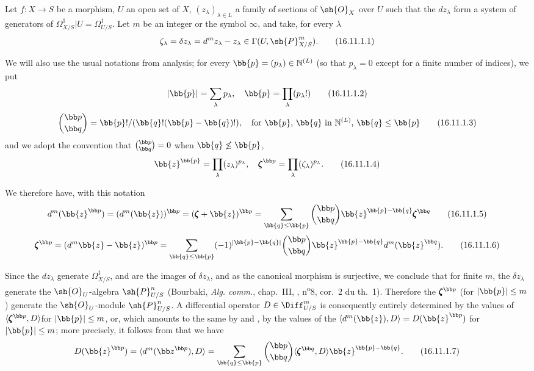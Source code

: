 \begin{env}[16.11.1]
\label{IV.16.11.1}
Let $f:X \to S$ be a morphism, $U$ an open set of $X$, $(z_\lambda)_{\lambda \in L}$ a family of sections of $\sh{O}_X$ over $U$ such that the $dz_\lambda$ form a system of generators of $\Omega_{X/S}^1|U = \Omega_{U/S}^1$.
Let $m$ be an integer or the symbol $\infty$, and take, for every $\lambda$
\[
  \label{IV.16.11.1.1}
  \zeta_\lambda = \delta z_\lambda = d^m z_\lambda - z_\lambda \in \Gamma(U, \sh{P}_{X/S}^m).
  \tag{16.11.1.1}
\]

We will also use the usual notations from analysis;
for every $\bb{p} = (p_\lambda) \in \mathbb{N}^{(L)}$ (so that $p_\lambda = 0$ except for a finite number of indices), we put
\[
  \label{IV.16.11.1.2}
  |\bb{p}| = \sum_\lambda p_\lambda, \quad \bb{p} = \prod_\lambda (p_\lambda!)
  \tag{16.11.1.2}
\]
\[
  \label{IV.16.11.1.3}
  \binom{\bb p}{\bb q} = \bb{p}!/(\bb{q}!(\bb{p} - \bb{q})!), \quad \text{for $\bb{p}$, $\bb{q}$ in $\mathbb{N}^{(L)}$, $\bb{q} \leq \bb{p}$}
  \tag{16.11.1.3}
\]
and we adopt the convention that $\binom{\bb p}{\bb q} = 0$ when $\bb{q} \not\leq \bb{p}$,
\[
  \label{IV.16.11.1.4}
  \bb{z}^\bb{p} = \prod_\lambda (z_\lambda)^{p_\lambda}, \quad {\pmb\zeta}^{\bb p} = \prod_\lambda (\zeta_\lambda)^{p_\lambda}.
  \tag{16.11.1.4}
\]

We therefore have, with this notation
\[
  \label{IV.16.11.1.5}
  d^m(\bb{z}^{\bb p}) = (d^m(\bb{z}))^{\bb p} = (\pmb{\zeta} + \bb{z})^{\bb p} = \sum_{\bb{q} \leq \bb{p}} \binom{\bb p}{\bb q} \bb{z}^{\bb{p} - \bb{q}} \pmb{\zeta}^{\bb q}
  \tag{16.11.1.5}
\]
\[
  \label{IV.16.11.1.6}
  \pmb{\zeta}^{\bb p} = (d^m \bb{z} - \bb{z})^{\bb p} =  \sum_{\bb{q} \leq \bb{p}} (-1)^{|\bb{p} - \bb{q}|} \binom{\bb p}{\bb q} \bb{z}^{\bb{p} - \bb{q}} d^m(\bb{z}^{\bb q}).
  \tag{16.11.1.6}
\]
  
Since the $dz_\lambda$ generate $\Omega_{X/S}^1$, and are the images of $\delta z_\lambda$, and as the canonical morphism  is surjective, we conclude that for finite $m$, the $\delta z_\lambda$ generate the $\sh{O}_U$-algebra $\sh{P}_{U/S}^n$ (Bourbaki, \emph{Alg. comm.}, chap.~III, , n\textsuperscript{o}8, cor.\ 2 du th.\ 1).
Therefore the $\pmb{\zeta}^{\bb p}$ (for $|\bb{p}| \leq m$) generate the $\sh{O}_U$-module $\sh{P}_{U/S}^n$.
A differential operator $D \in \Diff_{U/S}^m$ is consequently entirely determined by the values of $\langle \pmb{\zeta}^{\bb p}, D \rangle $for $|\bb{p}| \leq m$, or, which amounts to the same by  and , by the values
of the $\langle d^m(\bb{z}), D \rangle = D(\bb{z}^{\bb p})$ for $|\bb{p}| \leq m$;
more precisely, it follows from  that we have
\[
  \label{IV.16.11.1.7}
  D(\bb{z}^{\bb p}) = \langle d^m({\bb z}^{\bb p}), D \rangle = \sum_{\bb{q} \leq \bb{p}} \binom{\bb p}{\bb q} \langle \pmb{\zeta}^{\bb q} , D \rangle \bb{z}^{\bb{p} - \bb{q}}.
  \tag{16.11.1.7}
\]
\end{env}


